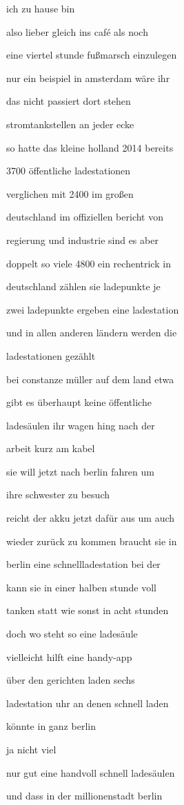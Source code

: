 \documentclass[a4paper, 11pt]{book} %
\begin{document}
ich zu hause bin

also lieber gleich ins café als noch

eine viertel stunde fußmarsch einzulegen

nur ein beispiel in amsterdam wäre ihr

das nicht passiert dort stehen

stromtankstellen an jeder ecke

so hatte das kleine holland 2014 bereits

3700 öffentliche ladestationen

verglichen mit 2400 im großen

deutschland im offiziellen bericht von

regierung und industrie sind es aber

doppelt so viele 4800 ein rechentrick in

deutschland zählen sie ladepunkte je

zwei ladepunkte ergeben eine ladestation

und in allen anderen ländern werden die

ladestationen gezählt

bei constanze müller auf dem land etwa

gibt es überhaupt keine öffentliche

ladesäulen ihr wagen hing nach der

arbeit kurz am kabel

sie will jetzt nach berlin fahren um

ihre schwester zu besuch

reicht der akku jetzt dafür aus um auch

wieder zurück zu kommen braucht sie in

berlin eine schnellladestation bei der

kann sie in einer halben stunde voll

tanken statt wie sonst in acht stunden

doch wo steht so eine ladesäule

vielleicht hilft eine handy-app

über den gerichten laden sechs

ladestation uhr an denen schnell laden

könnte in ganz berlin

ja nicht viel

nur gut eine handvoll schnell ladesäulen

und dass in der millionenstadt berlin
\end{document}
